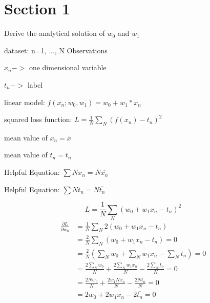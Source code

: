 \documentclass{report}
\begin{document}
\chapter{Section 1}

Derive the analytical solution of $w_0$ and $w_1$

\vspace{5mm}

dataset: n=1, ..., N Observations

$x_n ->$ one dimensional variable

$t_n ->$ label

linear model: $f(x_n; w_0, w_1) = w_0+w_1*x_n$

squared loss function: $L = \frac{1}{N} \sum_{N} (f(x_n) - t_n)^2$

mean value of $x_n = \overline{x}$

mean value of $t_n = \overline{t_n}$

Helpful Equation: $\sum{N} x_n = N\overline{x_n}$

Helpful Equation: $\sum{N} t_n = N\overline{t_n}$

$$L = \frac{1}{N} \sum_{N} (w_0+w_1 x_n - t_n)^2$$
\begin{equation} \label{eq1}
\begin{split}
\frac{\partial L}{\partial w_0} & = \frac{1}{N} \sum_{N} 2(w_0+w_1 x_n - t_n) \\
                                & = \frac{2}{N} \sum_{N} (w_0+w_1 x_n - t_n) = 0 \\
                                & = \frac{2}{N} (\sum_{N}w_0 + \sum_{N}w_1 x_n - \sum_{N}t_n) = 0 \\
                                & = \frac{2\sum_{N}w_0}{N} + \frac{2\sum_{N}w_1 x_n}{N} - \frac{2\sum_{N}t_n}{N} = 0 \\
                                & = \frac{2Nw_0}{N} + \frac{2w_1N\overline{x_n}}{N} - \frac{2N\overline{t_n}}{N} = 0 \\
                                & = 2w_0 + 2w_1\overline{x_n} - 2\overline{t_n} = 0
\end{split}
\end{equation}
\end{document}

